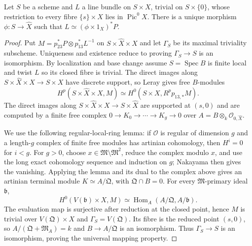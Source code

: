 \begin{theorem}
\label{mumford-thm-poincare-universal-mapping}
Let $S$ be a scheme and $L$ a line bundle on $S\times X$, trivial on
$S\times\{0\}$, whose restriction to every fibre $\{s\}\times X$ lies in
$\operatorname{Pic}^0X$. There is a unique morphism $\phi:S\to\widehat X$
such that $L\simeq(\phi\times1_X)^*P$.
\end{theorem}
\begin{proof}
Put $M=p_{23}^*P\otimes p_{13}^*L^{-1}$ on
$S\times\widehat X\times X$ and let $\Gamma_S$ be its maximal triviality
subscheme. Uniqueness and existence reduce to proving
$\Gamma_S\to S$ is an isomorphism. By localization and base change assume
$S=\operatorname{Spec}B$ is finite local and twist $L$ so its closed fibre
is trivial. The direct images along $S\times\widehat X\times X\to S\times X$
have discrete support, so Leray gives free $B$-modules
\[
H^p(S\times\widehat X\times X,M)
\simeq H^0(S\times X,R^pp_{13,*}M).
\]
The direct images along $S\times\widehat X\times X\to S\times\widehat X$
are supported at $(s,0)$ and are computed by a finite free complex
$0\to K_0\to\cdots\to K_g\to0$ over
$A=B\otimes_k\mathcal O_{0,\widehat X}$.

We use the following regular-local-ring lemma: if $\mathcal O$ is regular of
dimension $g$ and a length-$g$ complex of finite free modules has artinian
cohomology, then $H^i=0$ for $i<g$. For $g>0$, choose
$x\in\mathfrak M\setminus\mathfrak M^2$, reduce the complex modulo $x$,
and use the long exact cohomology sequence and induction on $g$; Nakayama
then gives the vanishing. Applying the lemma and its dual to the complex
above gives an artinian terminal module $K\simeq A/\mathfrak Q$, with
$\mathfrak Q\cap B=0$. For every $\mathfrak M$-primary ideal $\mathfrak b$,
\[
H^0(V(\mathfrak b)\times X,M)
\simeq\operatorname{Hom}_A(A/\mathfrak Q,A/\mathfrak b).
\]
The evaluation map is surjective after reduction at the closed point, hence
$M$ is trivial over $V(\mathfrak Q)\times X$ and
$\Gamma_S=V(\mathfrak Q)$. Its fibre is the reduced point $(s,0)$, so
$A/(\mathfrak Q+\mathfrak M_A)=k$ and $B\to A/\mathfrak Q$ is an
isomorphism. Thus $\Gamma_S\to S$ is an isomorphism, proving the universal
mapping property.
\end{proof}

